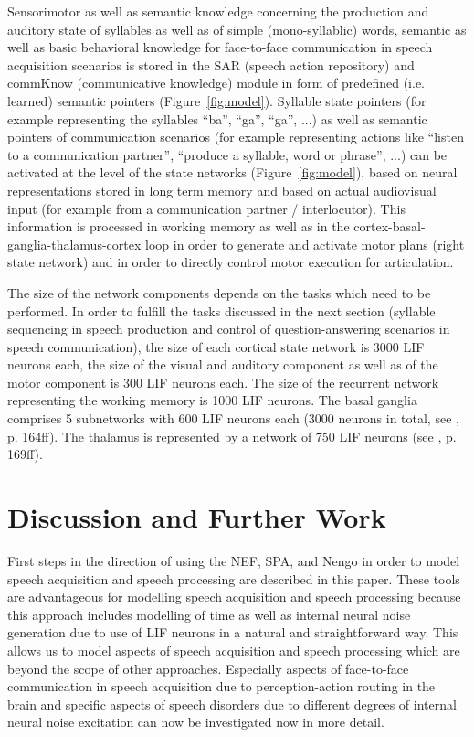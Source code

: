 \documentclass[conference]{IEEEtran}
\begin{document}
Sensorimotor as well as semantic knowledge concerning the production
and auditory state of syllables as well as of simple (mono-syllablic)
words, semantic as well as basic behavioral knowledge for face-to-face
communication in speech acquisition scenarios is stored in the SAR
(speech action repository) and commKnow (communicative knowledge)
module in form of predefined (i.e. learned) semantic pointers
(Figure~\ref{fig:model}).
Syllable state pointers (for example representing the syllables
``ba'', ``ga'', ``ga'', ...) as well as semantic pointers of
communication scenarios (for example representing actions like
``listen to a communication partner'', ``produce a syllable, word or
phrase'', ...) can be activated at the level of the state networks
(Figure~\ref{fig:model}),
based on neural representations stored in long term memory
and based on actual audiovisual input (for example from a
communication partner / interlocutor). This information is processed
in working memory as well as in the
cortex-basal-ganglia-thalamus-cortex loop in order to generate and
activate motor plans (right state network) and in order to directly
control motor execution for articulation.

The size of the network components depends on the tasks which need to
be performed. In order to fulfill the tasks discussed in the next
section (syllable sequencing in speech production and control of
question-answering scenarios in speech communication), the size of
each cortical state network is 3000 LIF neurons each, the size of
the visual and auditory component as well as of the motor component is
300 LIF neurons each. The size of the recurrent network representing
the working memory is 1000 LIF neurons. The basal ganglia comprises
5 subnetworks with 600 LIF neurons each (3000 neurons in
total, see \cite{eliasmith2013}, p. 164ff). The thalamus is
represented by a network of 750 LIF neurons (see
\cite{eliasmith2013}, p. 169ff).

\section{Discussion and Further Work}

First steps in the direction of using the NEF, SPA, and Nengo
in order to model speech acquisition and speech processing are
described in this paper. These tools are advantageous
for modelling speech acquisition and speech processing because this
approach includes modelling of time as well as internal neural noise
generation due to use of LIF neurons in a natural and straightforward
way. This allows us to model aspects of speech acquisition and speech
processing which are beyond the scope of other approaches. Especially
aspects of face-to-face communication in speech acquisition due to
perception-action routing in the brain and specific aspects of speech
disorders due to different degrees of internal neural noise excitation
can now be investigated now in more detail.
\end{document}
